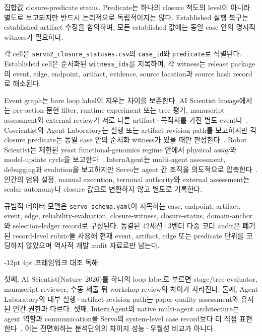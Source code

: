 \documentclass[11pt]{article}
\makeatletter
\renewcommand\subsection{\@startsection{subsection}{2}{\z@}%
  {-12pt \@plus -2pt \@minus -2pt}%
  {4pt \@plus 1pt}%
  {\normalfont\normalsize\bfseries}}
\makeatother
\begin{document}
\begin{table}[t]
\centering
\scriptsize

\caption{집합값 closure-predicate status. Predicate는 하나의 closure 척도의 level이 아니라 별도로 보고되지만 반드시 논리적으로 독립적이지는 않다. Established 실행 복구는 established artifact 수정을 함의하며, 모든 established 값에는 동일 case 안의 명시적 witness가 필요하다.}
\label{tab:status-matrix}
\label{tab:core-channels}
\end{table}

각 cell은 \texttt{servo2\_closure\_statuses.csv}의 \texttt{case\_id}와
\texttt{predicate}로 식별된다. Established cell은 순서화된
\texttt{witness\_ids}를 지목하며, 각 witness는 release package의 event, edge,
endpoint, artifact, evidence, source location과 source hash record로 해소된다.

Event graph는 bare loop label이 지우는 차이를 보존한다. AI Scientist lineage에서는 pre-action 문헌 filter, runtime experiment 또는 tree 평가, manuscript assessment와 external review가 서로 다른 artifact·목적지를 가진 별도 event다~\citep{lu2024aiscientist,lu2026aiscientist}. Coscientist와 Agent Laboratory는 실행 또는 artifact-revision path를 보고하지만 각 closure predicate는 동일 case 안의 순서화 witness가 있을 때만 판정한다~\citep{boiko2023emergent,schmidgall2025agentlab}. Robot Scientist는 제한된 yeast functional-genomics regime 안에서 physical assay와 model-update cycle을 보고한다~\citep{king2004robot,sparkes2010robot}. InternAgent는 multi-agent assessment, debugging과 evolution을 보고하지만 Servo는 agent 간 조직을 의도적으로 압축한다~\citep{zhang2025novelseek}. 인간의 범위 설정, manual execution, terminal authority와 external assessment는 scalar autonomy나 closure 값으로 변환하지 않고 별도로 기록한다.

규범적 데이터 모델은 \texttt{servo\_schema.yaml}이 지목하는 case, endpoint, artifact, event, edge, reliability-evaluation, closure-witness, closure-status, domain-anchor와 selection-ledger record로 구성된다. 동결된 42세션·3벤더 다중 코더 audit은 폐기된 record-level rubric을 사용해 현재 event, artifact, edge 또는 predicate 단위를 코딩하지 않았으며 역사적 개발 audit 자료로만 남는다.

\subsection{프레임워크 대조 독해}

첫째, AI Scientist(Nature~2026)를 하나의 loop label로 부르면 stage/tree evaluator, manuscript reviewer, 수동 제출 뒤 workshop review의 차이가 사라진다. 둘째, Agent Laboratory의 내부 실행·artifact-revision path는 paper-quality assessment와 유지된 인간 권한과 다르다. 셋째, InternAgent의 native multi-agent architecture는 agent 역할과 communication을 Servo의 system-level case record보다 더 직접 표현한다~\citep{zhang2025novelseek}. 이는 전면화하는 분석단위의 차이지 성능·우월성 비교가 아니다.
\end{document}
